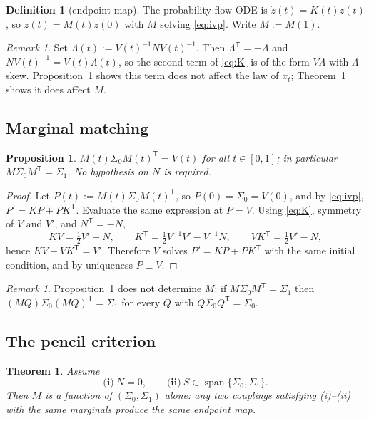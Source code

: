 \documentclass[11pt]{article}
\newtheorem{proposition}[lemma]{Proposition}
\newtheorem{theorem}[lemma]{Theorem}
\theoremstyle{definition}
\newtheorem{definition}[lemma]{Definition}
\theoremstyle{remark}
\newtheorem{remark}[lemma]{Remark}
\DeclareMathOperator{\spn}{span}
\newcommand{\T}{\mathsf{T}}
\begin{document}
\begin{definition}[endpoint map]\label{def:M}
The probability-flow ODE is $\dot z(t)=K(t)z(t)$, so $z(t)=M(t)z(0)$ with $M$ solving
\eqref{eq:ivp}. Write $M:=M(1)$.
\end{definition}

\begin{remark}\label{rem:fluxnull}
Set $\Lambda(t):=V(t)^{-1}NV(t)^{-1}$. Then $\Lambda^{\T}=-\Lambda$ and
$NV(t)^{-1}=V(t)\Lambda(t)$, so the second term of \eqref{eq:K} is of the form
$V\Lambda$ with $\Lambda$ skew. Proposition~\ref{prop:push} shows this term does not affect the
law of $x_t$; Theorem~\ref{thm:pencil} shows it does affect $M$.
\end{remark}

\subsection{Marginal matching}

\begin{proposition}\label{prop:push}
$M(t)\Sigma_0M(t)^{\T}=V(t)$ for all $t\in[0,1]$; in particular $M\Sigma_0M^{\T}=\Sigma_1$. No
hypothesis on $N$ is required.
\end{proposition}

\begin{proof}
Let $P(t):=M(t)\Sigma_0M(t)^{\T}$, so $P(0)=\Sigma_0=V(0)$, and by \eqref{eq:ivp},
$P'=KP+PK^{\T}$. Evaluate the same expression at $P=V$. Using \eqref{eq:K}, symmetry of $V$ and
$V'$, and $N^{\T}=-N$,
\[
KV=\tfrac12V'+N,
\qquad
K^{\T}=\tfrac12V^{-1}V'-V^{-1}N,
\qquad
VK^{\T}=\tfrac12V'-N,
\]
hence $KV+VK^{\T}=V'$. Therefore $V$ solves $P'=KP+PK^{\T}$ with the same initial condition, and by
uniqueness $P\equiv V$.
\end{proof}

\begin{remark}\label{rem:pushnotenough}
Proposition~\ref{prop:push} does not determine $M$: if $M\Sigma_0M^{\T}=\Sigma_1$ then
$(MQ)\Sigma_0(MQ)^{\T}=\Sigma_1$ for every $Q$ with $Q\Sigma_0Q^{\T}=\Sigma_0$.
\end{remark}

\subsection{The pencil criterion}

\begin{theorem}\label{thm:pencil}
Assume
\[
\textbf{(i)}\ N=0,
\qquad
\textbf{(ii)}\ S\in\spn\{\Sigma_0,\Sigma_1\}.
\]
Then $M$ is a function of $(\Sigma_0,\Sigma_1)$ alone: any two couplings satisfying
\textup{(i)}--\textup{(ii)} with the same marginals produce the same endpoint map.
\end{theorem}
\end{document}
